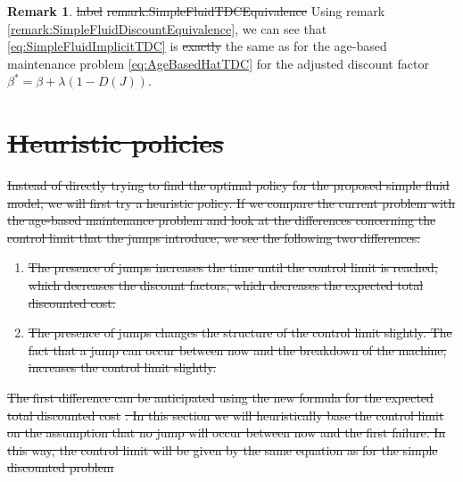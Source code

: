 \documentclass[a4paper]{thesis}
\theoremstyle{definition}
\newtheorem{remark}{Remark}[chapter]
\providecommand{\DIFaddtex}[1]{{\protect\color{blue}\uwave{#1}}} %
\providecommand{\DIFdeltex}[1]{{\protect\color{red}\sout{#1}}}                      %
\providecommand{\DIFaddbegin}{} %
\providecommand{\DIFaddend}{} %
\providecommand{\DIFdelbegin}{} %
\providecommand{\DIFdelend}{} %
\providecommand{\DIFadd}[1]{\texorpdfstring{\DIFaddtex{#1}}{#1}} %
\providecommand{\DIFdel}[1]{\texorpdfstring{\DIFdeltex{#1}}{}} %
\newcommand{\DIFscaledelfig}{0.5}
\newlength{\DIFdelgraphicswidth} %
\newlength{\DIFdelgraphicsheight} %
\newcommand{\DIFaddincludegraphics}[2][]{{\color{blue}\fbox{\DIFOincludegraphics[#1]{#2}}}} %
\newcommand{\DIFdelincludegraphics}[2][]{%
	\sbox{\DIFdelgraphicsbox}{\DIFOincludegraphics[#1]{#2}}%
	\settoboxwidth{\DIFdelgraphicswidth}{\DIFdelgraphicsbox} %
	\settoboxtotalheight{\DIFdelgraphicsheight}{\DIFdelgraphicsbox} %
	\scalebox{\DIFscaledelfig}{%
		\parbox[b]{\DIFdelgraphicswidth}{\usebox{\DIFdelgraphicsbox}\\[-\baselineskip] \rule{\DIFdelgraphicswidth}{0em}}\llap{\resizebox{\DIFdelgraphicswidth}{\DIFdelgraphicsheight}{%
				\setlength{\unitlength}{\DIFdelgraphicswidth}%
				\begin{picture}(1,1)%
				\thicklines\linethickness{2pt} %
				{\color[rgb]{1,0,0}\put(0,0){\framebox(1,1){}}}%
				{\color[rgb]{1,0,0}\put(0,0){\line( 1,1){1}}}%
				{\color[rgb]{1,0,0}\put(0,1){\line(1,-1){1}}}%
				\end{picture}%
			}\hspace*{3pt}}} %
} %
\DeclareRobustCommand{\DIFaddbegin}{\DIFOaddbegin \let\includegraphics\DIFaddincludegraphics} %
\DeclareRobustCommand{\DIFaddend}{\DIFOaddend \let\includegraphics\DIFOincludegraphics} %
\DeclareRobustCommand{\DIFdelbegin}{\DIFOdelbegin \let\includegraphics\DIFdelincludegraphics} %
\DeclareRobustCommand{\DIFdelend}{\DIFOaddend \let\includegraphics\DIFOincludegraphics} %
\begin{document}
	\begin{remark}\DIFdelbegin \DIFdel{label}%
		\DIFdel{remark:SimpleFluidTDCEquivalence}%
		\DIFdelend \DIFaddbegin \label{remark:SimpleFluidTDCEquivalence}
		\DIFaddend Using remark \ref{remark:SimpleFluidDiscountEquivalence}, we can see that \eqref{eq:SimpleFluidImplicitTDC} is \DIFdelbegin \DIFdel{exactly }\DIFdelend \DIFaddbegin \DIFadd{again }\DIFaddend the same as for the age-based maintenance problem \eqref{eq:AgeBasedHatTDC} for the adjusted discount factor $\beta^*=\beta+\lambda(1-D(J))$.
	\end{remark} \DIFdelbegin \section{\DIFdel{Heuristic policies}}
	\addtocounter{section}{-1}%
	\DIFdel{Instead of directly trying to find the optimal policy for the proposed simple fluid model, we will first try a heuristic policy.
		If we compare the current problem with the age-based maintenance problem and look at the differences concerning the control limit that the jumps introduce, we see the following two differences:
	}%
	\begin{enumerate}%
		\item%
		\DIFdel{The presence of jumps increases the time until the control limit is reached, which decreases the discount factors, which decreases the expected total discounted cost.
		}%
		\item%
		\DIFdel{The presence of jumps changes the structure of the control limit slightly.
			The fact that a jump can occur between now and the breakdown of the machine, increases the control limit slightly.
		}
	\end{enumerate}%
	\DIFdel{The first difference can be anticipated using the new formula for the expected total discounted cost }%
	\DIFdel{.
		In this section we will heuristically base the control limit on the assumption that no jump will occur between now and the first failure.
		In this way, the control limit will be given by the same equation as for the simple discounted problem }%
\end{document}
